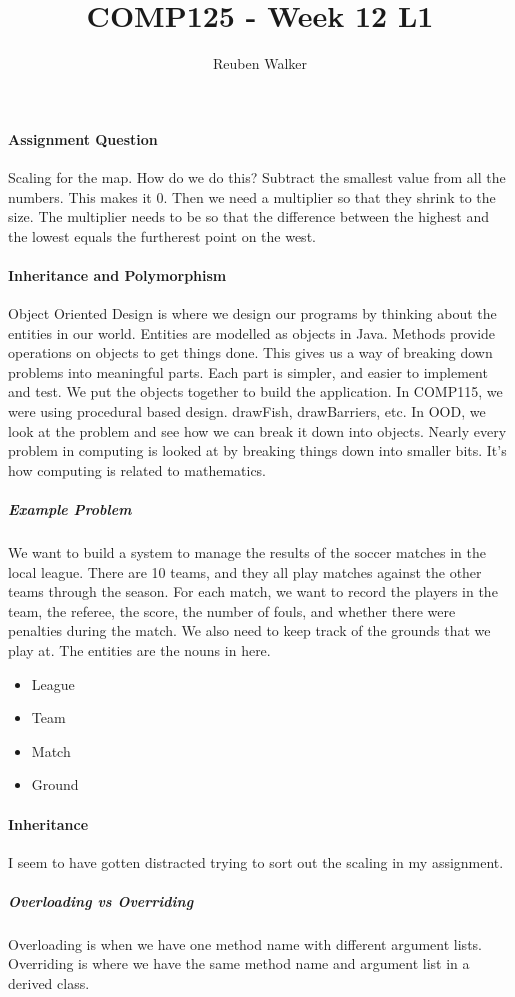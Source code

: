 \documentclass[10pt,a4paper]{article}
\author{Reuben Walker}
\title{COMP125 - Week 12 L1}
\begin{document}
\maketitle
\paragraph{Assignment Question}
Scaling for the map. How do we do this? Subtract the smallest value from all the numbers. This makes it 0.
Then we need a multiplier so that they shrink to the size. The multiplier needs to be so that the difference between the highest and the lowest equals the furtherest point on the west.
\paragraph{Inheritance and Polymorphism}
Object Oriented Design is where we design our programs by thinking about the entities in our world. Entities are modelled as objects in Java. Methods provide operations on objects to get things done. This gives us a way of breaking down problems into meaningful parts. Each part is simpler, and easier to implement and test. We put the objects together to build the application. In COMP115, we were using procedural based design. drawFish, drawBarriers, etc. In OOD, we look at the problem and see how we can break it down into objects. Nearly every problem in computing is looked at by breaking things down into smaller bits. It's how computing is related to mathematics.
\subparagraph{Example Problem}
We want to build a system to manage the results of the soccer matches in the local league. There are 10 teams, and they all play matches against the other teams through the season. For each match, we want to record the players in the team, the referee, the score, the number of fouls, and whether there were penalties during the match. We also need to keep track of the grounds that we play at. The entities are the nouns in here.
\begin{itemize}
\item League
\item Team
\item Match
\item Ground
\end{itemize}
\paragraph{Inheritance}
I seem to have gotten distracted trying to sort out the scaling in my assignment.
\subparagraph{Overloading vs Overriding}
Overloading is when we have one method name with different argument lists. Overriding is where we have the same method name and argument list in a derived class.
\end{document}
